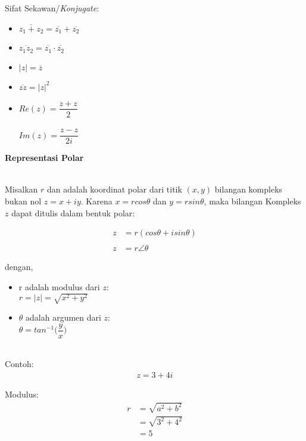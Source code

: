 \documentclass{article}
\begin{document}
Sifat Sekawan/\textit{Konjugate}:
\begin{itemize}
    \item $\overline{z_1 + z_2} = \overline{z_1} + \overline{z_2}$
    \item $\overline{z_1 z_2} = \overline{z_1} \cdot \overline{z_2}$
    \item $|z| = \overline{z}$
    \item $\overline{zz} = |z|^2$
    \item $Re(z) = \dfrac{z+z}{2}$\\ \\
          $Im(z) = \dfrac{z-z}{2i}$
\end{itemize}



\newpage
\begin{center}
    \textbf{Representasi Polar}
\end{center}
\leavevmode\\

Misalkan $r$ dan adalah koordinat polar dari titik $(x, y)$ bilangan kompleks bukan nol $z = x + iy$. Karena $x = r cos \theta $ dan $y = r sin \theta$, maka bilangan Kompleks $z$ dapat
ditulis dalam bentuk polar:

\begin{align}
    z & = r(cos \theta + i sin \theta)
    \nonumber                          \\
    \nonumber                          \\
    z & = r \angle \theta
    \nonumber
\end{align}

dengan,
\begin{itemize}
    \item r adalah modulus dari $z$:\\
          $ r = |z| = \sqrt{x^2+y^2} $
    \item $\theta$ adalah argumen dari $z$:\\
          $ \theta = tan^{-1} \bigg(\dfrac{y}{x}\bigg) $
\end{itemize}
\leavevmode\\

Contoh:
\begin{align}
    z = 3 + 4i \nonumber
\end{align}

Modulus:
\begin{align}
    r & = \sqrt{a^2 + b^2}
    \nonumber              \\
      & = \sqrt{3^2 + 4^2}
    \nonumber              \\
      & = 5
    \nonumber
\end{align}
\end{document}
